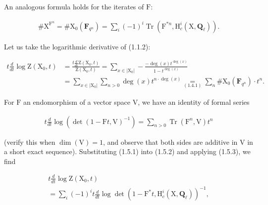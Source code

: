 \documentclass[10pt,leqno]{article}
\begin{document}
\noindent An analogous formula holds for the iterates of \(\mathrm{F}\):\par

\begin{equation*}\begin{gathered}\# \mathrm{X}^{\mathrm{F}^{n}} = \# \mathrm{X}_{0}(\mathbf{F}_{q^{n}}) = \sum _{i} (- 1)^{i} \operatorname{Tr}(\mathrm{F}^{*n}, \mathrm{H}_{c}^{i}(\mathrm{X}, \mathbf{Q}_{\ell })).\end{gathered}\tag{1.5.1}\end{equation*}

\noindent Let us take the logarithmic derivative of (1.1.2):\par

\begin{equation*}\begin{aligned}
t\frac{d}{dt}\log\mathrm Z(\mathrm X_0,t)&=\frac{t\frac{d}{dt}\mathrm Z(\mathrm X_0,t)}{\mathrm Z(\mathrm X_0,t)}
=\sum_{x\in|\mathrm X_0|}-\frac{-\deg(x)t^{\deg(x)}}{1-t^{\deg(x)}}\\
&=\sum_{x\in|\mathrm X_0|}\sum_{n>0}\deg(x)t^{n\cdot\deg(x)}
\underset{(1.4.1)}{=}\sum_n\#\mathrm X_0(\mathbf F_{q^n})\cdot t^n.
\end{aligned}\tag{1.5.2}\end{equation*}

\noindent For \(\mathrm{F}\) an endomorphism of a vector space \(\mathrm{V}\), we have an identity of formal series\par

\begin{equation*}\begin{gathered}t \frac{d}{dt} \operatorname{log}(\operatorname{det}(1- \mathrm{F}t, \mathrm{V})^{- 1}) = \sum _{n>0} \operatorname{Tr}(\mathrm{F}^{n}, \mathrm{V})t^{n}\end{gathered}\tag{1.5.3}\end{equation*}

\clearpage

\label{physical-5}

\noindent (verify this when \(\operatorname{dim}(\mathrm{V})=1\), and observe that both sides are additive in \(\mathrm{V}\) in a short exact sequence). Substituting (1.5.1) into (1.5.2) and applying (1.5.3), we find\par

\begin{equation*}\begin{gathered}t \frac{d}{dt} \operatorname{log} \mathrm{Z}(\mathrm{X}_{0},t) \\ = \sum _{i} (- 1)^{i} t \frac{d}{dt} \operatorname{log} \operatorname{det}(1- \mathrm{F}^{*}t, \mathrm{H}_{c}^{i}(\mathrm{X},\mathbf{Q}_{\ell }))^{- 1},\end{gathered}\end{equation*}
\end{document}
